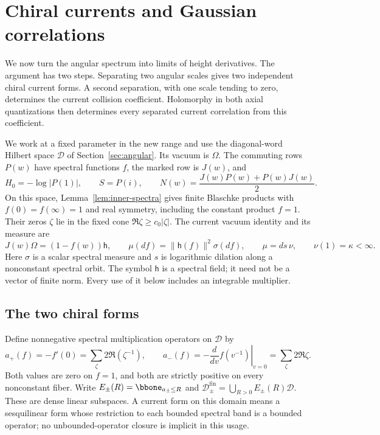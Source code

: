 \section{Chiral currents and Gaussian correlations}\label{sec:chiral}

We now turn the angular spectrum into limits of height derivatives. The
argument has two steps. Separating two angular scales gives two independent
chiral current forms. A second separation, with one scale tending to zero,
determines the current collision coefficient. Holomorphy in both axial
quantizations then determines every separated current correlation from this
coefficient.

We work at a fixed parameter in the new range and use the diagonal-word
Hilbert space $\mathcal D$ of Section~\ref{sec:angular}. Its vacuum is
$\Omega$. The commuting rows $P(w)$ have spectral functions $f$, the marked
row is $J(w)$, and
\[
 H_0=-\log|P(1)|,\qquad S=P(i),\qquad
 N(w)=\frac{J(w)P(w)+P(w)J(w)}2.
\]
On this space, Lemma~\ref{lem:inner-spectra} gives finite Blaschke products
with $f(0)=f(\infty)=1$ and real symmetry, including the constant product
$f=1$. Their zeros $\zeta$ lie in the fixed cone
$\Re\zeta\ge c_0|\zeta|$. The current vacuum identity and its measure are
\begin{equation}\label{eq:chiral-vacuum-data}
 J(w)\Omega=(1-f(w))\mathsf h,\qquad
 \mu(df)=\|\mathsf h(f)\|^2\sigma(df),\qquad
 \mu=ds\,\nu,\qquad \nu(1)=\kappa<\infty.
\end{equation}
Here $\sigma$ is a scalar spectral measure and $s$ is logarithmic
dilation along a nonconstant spectral orbit.
The symbol $\mathsf h$ is a spectral field; it need not be a vector of finite
norm. Every use of it below includes an integrable multiplier.

\subsection{The two chiral forms}

Define nonnegative spectral multiplication operators on $\mathcal D$ by
\begin{equation}\label{eq:chiral-energies}
 a_+(f)=-f'(0)=\sum_{\zeta}2\Re(\zeta^{-1}),\qquad
 a_-(f)=-\left.\frac{d}{dv}f(v^{-1})\right|_{v=0}
                         =\sum_{\zeta}2\Re\zeta.
\end{equation}
Both values are zero on $f=1$, and both are strictly positive on every
nonconstant fiber. Write $E_\pm(R)=\bbone_{a_\pm\le R}$ and
$\mathcal D_\pm^{\mathrm{fin}}=\bigcup_{R>0}E_\pm(R)\mathcal D$.
These are dense linear subspaces. A current form on this domain means a
sesquilinear form whose restriction to each bounded spectral band is a
bounded operator; no unbounded-operator closure is implicit in this usage.

